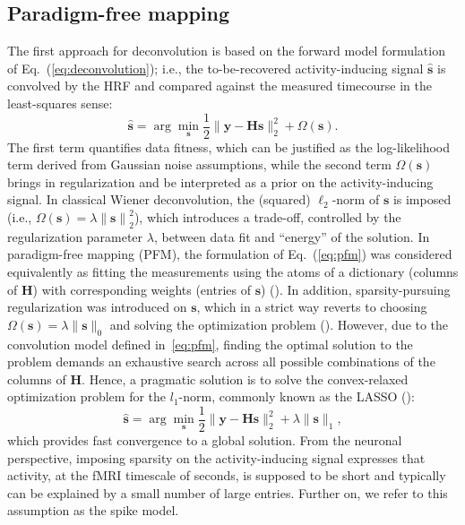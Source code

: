 \subsection{Paradigm-free mapping}
The first approach for deconvolution is based on the forward model formulation of Eq.~(\ref{eq:deconvolution}); i.e., the to-be-recovered activity-inducing signal $\hat{\mathbf{s}}$ is convolved by the HRF and compared against the measured timecourse in the least-squares sense: 
\begin{equation}
    \label{eq:pfm}
    \hat{\mathbf{s}} = \arg \min_{\mathbf{s}} \frac{1}{2} \| \mathbf{y} - \mathbf{Hs} \|_2^2 + \Omega(\mathbf{s}).
\end{equation}
The first term quantifies data fitness, which can be justified as the log-likelihood term derived from Gaussian noise assumptions, while the second term \(\Omega(\mathbf{s})\) brings in regularization and be interpreted as a prior on the activity-inducing signal. In classical Wiener deconvolution, the (squared) $\ell_2$-norm of $\mathbf{s}$ is imposed (i.e., $\Omega(\mathbf{s})=\lambda \left\| \mathbf{s}\right\|_2^2$), which introduces a trade-off, controlled by the regularization parameter $\lambda$, between data fit and ``energy'' of the solution. In paradigm-free mapping (PFM), the formulation of Eq.~(\ref{eq:pfm}) was considered equivalently as fitting the measurements using the atoms of a dictionary (columns of $\mathbf{H}$) with corresponding weights (entries of $\mathbf{s}$) (\citealt{gaudes2011DetectionCharacterizationSingletrial,caballerogaudes2013ParadigmFreeMapping,urunuela2020StabilityBasedSparseParadigm}). 
In addition, sparsity-pursuing regularization was introduced on $\mathbf{s}$, which in a strict way reverts to choosing \(\Omega(\mathbf{s})=\lambda \| \mathbf{s} \|_0\) and solving the optimization problem (\citealt{bruckstein2009SparseSolutionsSystems}). However, due to the convolution model defined in~\eqref{eq:pfm}, finding the optimal solution to the problem demands an exhaustive search across all possible combinations of the columns of \(\mathbf{H}\). Hence, a  pragmatic solution is to solve the convex-relaxed optimization problem for the \(l_1\)-norm, commonly known as the LASSO (\citealt{tibshirani1996RegressionShrinkageSelection}): 
\begin{equation}
    \label{eq:pfm_spike}
    \hat{\mathbf{s}} = \arg \min_{\mathbf{s}} \frac{1}{2} \| \mathbf{y} - \mathbf{Hs} \|_2^2 + \lambda \| \mathbf{s} \|_1,
\end{equation}
which provides fast convergence to a global solution. From the neuronal perspective, imposing sparsity on the activity-inducing signal expresses that activity, at the fMRI timescale of seconds, is supposed to be short and typically can be explained by a small number of large entries. Further on, we refer to this assumption as the spike model. 

